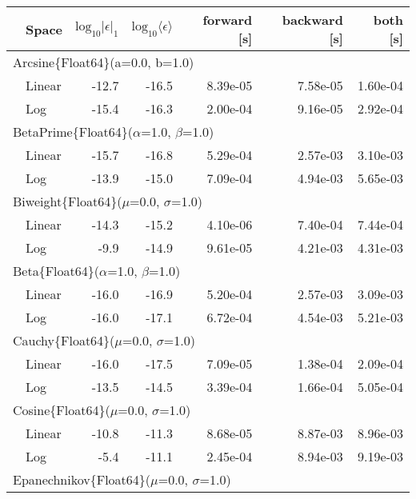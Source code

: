 \begin{tabular}{|llrrrrr|} \hline
& Space & $\mbox{log}_{10}|\epsilon|_1$ & $\mbox{log}_{10}\langle\epsilon\rangle$ & forward [s] & backward [s] & both [s]\\ \hline
\multicolumn{7}{|l|}{Arcsine\{Float64\}(a=0.0, b=1.0)}\\ \hline
& Linear & -12.7 & {\color{blue}-16.5} & {\color{blue}8.39e-05} & {\color{blue}7.58e-05} & {\color{blue}1.60e-04}\\
& Log & {\color{blue}-15.4} & -16.3 & 2.00e-04 & 9.16e-05 & 2.92e-04\\
\hline
\multicolumn{7}{|l|}{BetaPrime\{Float64\}($\alpha$=1.0, $\beta$=1.0)}\\ \hline
& Linear & {\color{blue}-15.7} & {\color{blue}-16.8} & {\color{blue}5.29e-04} & {\color{blue}2.57e-03} & {\color{blue}3.10e-03}\\
& Log & -13.9 & -15.0 & 7.09e-04 & 4.94e-03 & 5.65e-03\\
\hline
\multicolumn{7}{|l|}{Biweight\{Float64\}($\mu$=0.0, $\sigma$=1.0)}\\ \hline
& Linear & {\color{blue}-14.3} & {\color{blue}-15.2} & {\color{blue}4.10e-06} & {\color{blue}7.40e-04} & {\color{blue}7.44e-04}\\
& Log & -9.9 & -14.9 & 9.61e-05 & 4.21e-03 & 4.31e-03\\
\hline
\multicolumn{7}{|l|}{Beta\{Float64\}($\alpha$=1.0, $\beta$=1.0)}\\ \hline
& Linear & -16.0 & -16.9 & {\color{blue}5.20e-04} & {\color{blue}2.57e-03} & {\color{blue}3.09e-03}\\
& Log & {\color{blue}-16.0} & {\color{blue}-17.1} & 6.72e-04 & 4.54e-03 & 5.21e-03\\
\hline
\multicolumn{7}{|l|}{Cauchy\{Float64\}($\mu$=0.0, $\sigma$=1.0)}\\ \hline
& Linear & {\color{blue}-16.0} & {\color{blue}-17.5} & {\color{blue}7.09e-05} & {\color{blue}1.38e-04} & {\color{blue}2.09e-04}\\
& Log & -13.5 & -14.5 & 3.39e-04 & 1.66e-04 & 5.05e-04\\
\hline
\multicolumn{7}{|l|}{Cosine\{Float64\}($\mu$=0.0, $\sigma$=1.0)}\\ \hline
& Linear & {\color{blue}-10.8} & {\color{blue}-11.3} & {\color{blue}8.68e-05} & {\color{blue}8.87e-03} & {\color{blue}8.96e-03}\\
& Log & -5.4 & -11.1 & 2.45e-04 & 8.94e-03 & 9.19e-03\\
\hline
\multicolumn{7}{|l|}{Epanechnikov\{Float64\}($\mu$=0.0, $\sigma$=1.0)}\\ \hline

\end{tabular}
